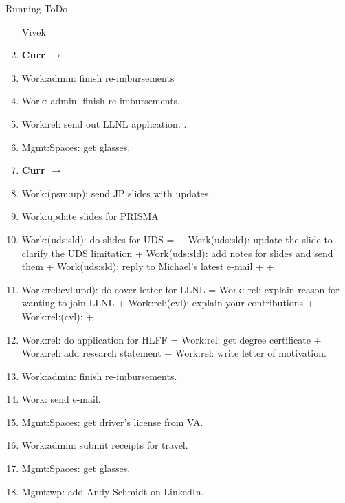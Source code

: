 \begin{columns}
\begin{column}{0.6\linewidth}
\begin{block}{Running ToDo}
\begin{enumerate}
Vivek


\item \tiny \textbf{Curr} $\rightarrow$ 

\item \tiny Work:admin: finish re-imbursements 
  
\item \tiny Work: admin: finish re-imbursements. 
\item \tiny Work:rel: send out LLNL application. 
  . 

\item \tiny Mgmt:Spaces: get glasses. 


\item \tiny \textbf{Curr} $\rightarrow$ 
\item \tiny Work:(psm:up): send JP slides with updates. 
\item \tiny Work:update slides for PRISMA

\item \tiny Work:(uds:sld): do slides for UDS =  + 
  Work(uds:sld): update the slide to clarify the UDS limitation + Work(uds:sld): add notes 
  for slides and send them  + Work(uds:sld): reply to Michael's
  latest e-mail +  
  +  

\item \tiny Work:rel:cvl:upd):  do cover letter for LLNL = Work: rel:
  explain reason for wanting to join LLNL + Work:rel:(cvl): explain
  your contributions + Work:rel:(cvl):  +  

\item \tiny Work:rel: do application for HLFF = Work:rel: get degree
  certificate + Work:rel: add research statement + Work:rel: write
  letter of motivation.

\item \tiny Work:admin: finish re-imbursements. 

\item \tiny Work: send e-mail. 

\item \tiny Mgmt:Spaces: get driver's license from VA. 
\item \tiny Work:admin: submit receipts for travel. 
\item \tiny Mgmt:Spaces: get glasses. 
\item \tiny Mgmt:wp: add Andy Schmidt on LinkedIn.  


\end{enumerate}
\end{block}
\end{column}
\end{columns}
